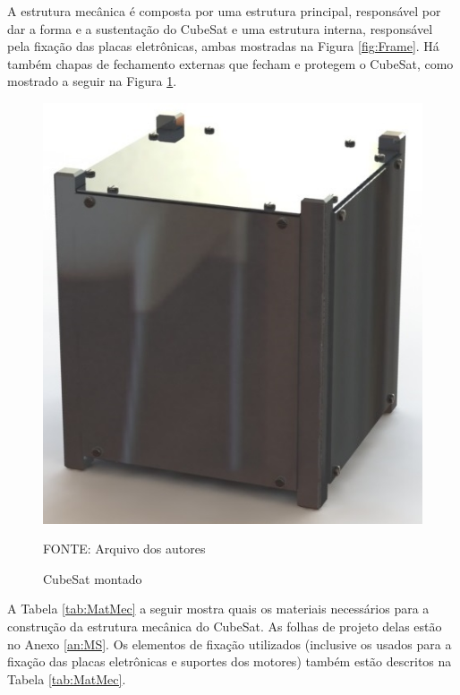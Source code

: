 \documentclass[
	12pt,				%
	openany,			%
	twoside,			%
	a4paper,			%
	english,			%
	french,				%
	spanish,			%
	brazil,				%
	oldfontcommands
	]{abntex2}
\begin{document}
\newpage

A estrutura mecânica é composta por uma estrutura principal, responsável por dar a forma e a sustentação do CubeSat e uma estrutura interna, responsável pela fixação das placas eletrônicas, ambas mostradas na Figura \ref{fig:Frame}. Há também chapas de fechamento externas que fecham e protegem o CubeSat, como mostrado a seguir na Figura \ref{fig:FrameFull}.

\begin{figure}[th]
	\caption{CubeSat montado}
	\centering
	\includegraphics[width=0.5\linewidth]{./figs/Frame_Full}
	
	\begin{small}
		FONTE: Arquivo dos autores
	\end{small}
	\label{fig:FrameFull}
\end{figure}

\newpage

A Tabela \ref{tab:MatMec} a seguir mostra quais os materiais necessários para a construção da estrutura mecânica do CubeSat. As folhas de projeto delas estão no Anexo \ref{an:MS}. Os elementos de fixação utilizados (inclusive os usados para a fixação das placas eletrônicas e suportes dos motores) também estão descritos na Tabela \ref{tab:MatMec}.
\end{document}
